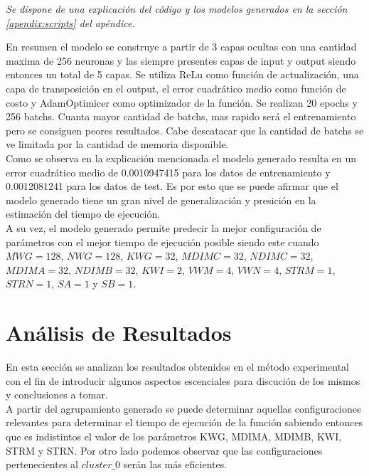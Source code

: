 \documentclass[osajnl,twocolumn,showpacs,superscriptaddress,10pt]{revtex4-1} %
\begin{document}
\begin{flushright}
\textit{\footnotesize Se dispone de una explicación del código y los modelos generados en la sección \ref{apendix:scripts} del apéndice.}
\end{flushright}

En resumen el modelo se construye a partir de 3 capas ocultas con una cantidad maxima de 256 neuronas y las siempre presentes capas de input y output siendo entonces un total de 5 capas. Se utiliza ReLu como función de actualización, una capa de transposición en el output, el error cuadrático medio como función de costo y AdamOptimicer como optimizador de la función. Se realizan 20 epochs y 256 batchs. Cuanta mayor cantidad de batchs, mas rapido será el entrenamiento pero se consiguen peores resultados. Cabe descatacar que la cantidad de batchs se ve limitada por la cantidad de memoria disponible. \\

Como se observa en la explicación mencionada el modelo generado resulta en un error cuadrático medio de 0.0010947415 para los datos de entrenamiento y 0.0012081241 para los datos de test. Es por esto que se puede afirmar que el modelo generado tiene un gran nivel de generalización y presición en la estimación del tiempo de ejecución. \\

A su vez, el modelo generado permite predecir la mejor configuración de parámetros con el mejor tiempo de ejecución posible siendo este cuando $MWG = 128$, $NWG = 128$,  $KWG = 32$,  $MDIMC = 32$, $NDIMC = 32$, $MDIMA = 32$, $ NDIMB = 32$, $KWI = 2$, $VWM = 4$, $VWN = 4$, $STRM = 1$, $STRN = 1$, $SA = 1$ y $SB = 1$. \\

\section{Análisis de Resultados} \label{section:results_analysis}

En esta sección se analizan los resultados obtenidos en el método experimental con el fin de introducir algunos aspectos escenciales para discución de los mismos y conclusiones a tomar. \\

A partir del agrupamiento generado se puede determinar aquellas configuraciones relevantes para determinar el tiempo de ejecución de la función sabiendo entonces que es indistintos el valor de los parámetros KWG, MDIMA, MDIMB, KWI, STRM y STRN. Por otro lado podemos observar que las configuraciones pertenecientes al $cluster\_0$ serán las más eficientes. \\
\end{document}
